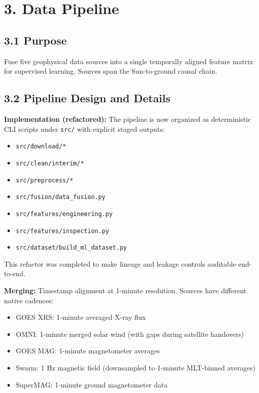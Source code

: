\documentclass{article}
\begin{document}
\section*{3. Data Pipeline}

\subsection*{3.1 Purpose}

Fuse five geophysical data sources into a single temporally aligned feature matrix for supervised learning. Sources span the Sun-to-ground causal chain.

\subsection*{3.2 Pipeline Design and Details}

\textbf{Implementation (refactored):} The pipeline is now organized as deterministic CLI scripts under \texttt{src/} with explicit staged outputs:
\begin{itemize}
  \item \texttt{src/download/*}
  \item \texttt{src/clean/interim/*}
  \item \texttt{src/preprocess/*}
  \item \texttt{src/fusion/data\_fusion.py}
  \item \texttt{src/features/engineering.py}
  \item \texttt{src/features/inspection.py}
  \item \texttt{src/dataset/build\_ml\_dataset.py}
\end{itemize}
This refactor was completed to make lineage and leakage controls auditable end-to-end.

\textbf{Merging:} Timestamp alignment at 1-minute resolution. Sources have different native cadences:
\begin{itemize}
  \item GOES XRS: 1-minute averaged X-ray flux
  \item OMNI: 1-minute merged solar wind (with gaps during satellite handovers)
  \item GOES MAG: 1-minute magnetometer averages
  \item Swarm: 1 Hz magnetic field (downsampled to 1-minute MLT-binned averages)
  \item SuperMAG: 1-minute ground magnetometer data
\end{itemize}
\end{document}
